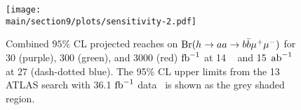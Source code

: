 \begin{figure}[h]
\begin{center}
\texttt{[image: \\main/section9/plots/sensitivity-2.pdf]}
\caption{\small Combined $95\%$ CL projected reaches on ${\mathrm{Br}}(h\to aa \to b\bar{b}\mu^+ \mu^-)$ for 30 (purple), 300 (green), and 3000 (red) ${\rm fb}^{-1}$ at 14 \UTeV~\cite{Curtin:2014pda} and 15 $\mbox{\ensuremath{\,\text{ab}^\text{$-$1}}}$ at 27 \UTeV (dash-dotted blue). The 95\% CL upper limits from the 13 \UTeV ATLAS search with 36.1 ${\rm fb}^{-1}$ data~\cite{Aaboud:2018esj} is shown as the grey shaded region.}
\label{bbmumu}
\end{center}
\end{figure}
